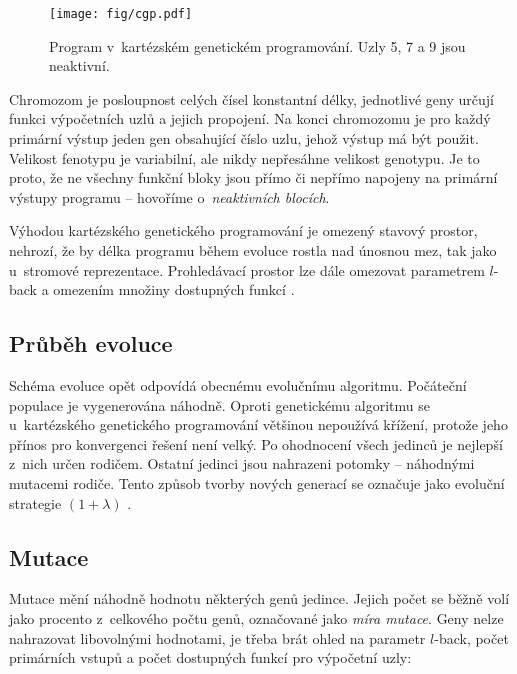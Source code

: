 \begin{figure}[htb]
    \centering\texttt{[image: fig/cgp.pdf]}
    \caption{Program v~kartézském genetickém programování. Uzly 5, 7 a 9 jsou neaktivní.}
    \label{obrCGP}
\end{figure}

Chromozom je posloupnost celých čísel konstantní délky, jednotlivé geny určují funkci výpočetních uzlů a jejich propojení. Na konci chromozomu je pro každý primární výstup jeden gen obsahující číslo uzlu, jehož výstup má být použit. Velikost fenotypu je variabilní, ale nikdy nepřesáhne velikost genotypu. Je to proto, že ne všechny funkční bloky jsou přímo či nepřímo napojeny na primární výstupy programu -- hovoříme o~\emph{neaktivních blocích}.

Výhodou kartézského genetického programování je omezený stavový prostor, nehrozí, že by délka programu během evoluce rostla nad únosnou mez, tak jako u~stromové reprezentace. Prohledávací prostor lze dále omezovat parametrem $l$-back a omezením množiny dostupných funkcí \cite{ZelenaCGP, Modra, HandbookGP}.

\subsection{Průběh evoluce}
\label{secCGPEvo}

Schéma evoluce opět odpovídá obecnému evolučnímu algoritmu. Počáteční populace je vygenerována náhodně. Oproti genetickému algoritmu se u~kartézského genetického programování většinou nepoužívá křížení, protože jeho přínos pro konvergenci řešení není velký. Po ohodnocení všech jedinců je nejlepší z~nich určen rodičem. Ostatní jedinci jsou nahrazeni potomky -- náhodnými mutacemi rodiče. Tento způsob tvorby nových generací se označuje jako evoluční strategie $(1 + \lambda)$ \cite{Modra}.

\subsection{Mutace}

Mutace mění náhodně hodnotu některých genů jedince. Jejich počet se běžně volí jako procento z~celkového počtu genů, označované jako \emph{míra mutace}. Geny nelze nahrazovat libovolnými hodnotami, je třeba brát ohled na parametr $l$-back, počet primárních vstupů a počet dostupných funkcí pro výpočetní uzly:

